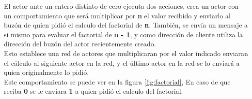 El actor ante un entero distinto de cero ejecuta dos acciones, crea un actor con
un comportamiento que será multiplicar por \textbf{n} el valor recibido y
enviarlo al buzón de quien pidió el calculo del factorial de \textbf{n}.
También, se envía un mensaje a si mismo para evaluar el factorial de \textbf{n -
  1}, y como dirección de cliente utiliza la dirección del buzón del actor
recientemente creado. \\
Esto establece una red de actores que multiplicaran por 
el valor indicado enviaran el cálculo al siguiente actor en la red, y el último actor 
en la red se lo enviará a quien originalmente lo pidió. \\
Este comportamiento se puede ver en la figura \ref{fig:factorial}, 
En caso de que reciba \textbf{0} se le enviara \textbf{1} a quien pidió el
calculo del factorial. 

